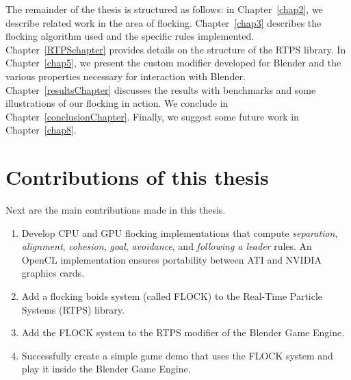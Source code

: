 

The remainder of the thesis is structured as follows:  in Chapter~\ref{chap2}, we describe related work in the area of flocking. Chapter~\ref{chap3} describes the flocking algorithm used and the specific rules implemented. Chapter~\ref{RTPSchapter} provides details on the structure of the RTPS library. In Chapter~\ref{chap5}, we present the custom modifier developed for Blender and the various properties necessary for interaction with Blender. Chapter~\ref{resultsChapter} discusses the results with benchmarks and some illustrations of our flocking in action. We conclude in Chapter~\ref{conclusionChapter}.  Finally, we suggest some future work in Chapter~\ref{chap8}. 

\section{Contributions of this thesis}
Next are the main contributions made in this thesis.
\begin{enumerate}
\item Develop CPU and GPU flocking implementations that compute \textit{separation}, \textit{alignment}, \textit{cohesion}, \textit{goal}, \textit{avoidance}, and \textit{following a leader} rules. An OpenCL implementation ensures portability between ATI and NVIDIA graphics cards.
\item Add a flocking boids system (called FLOCK) to the Real-Time Particle Systems (RTPS) library.
\item Add the FLOCK system to the RTPS modifier of the Blender Game Engine.
\item Successfully create a simple game demo that uses the FLOCK system and play it inside the Blender Game Engine.
\end{enumerate}
